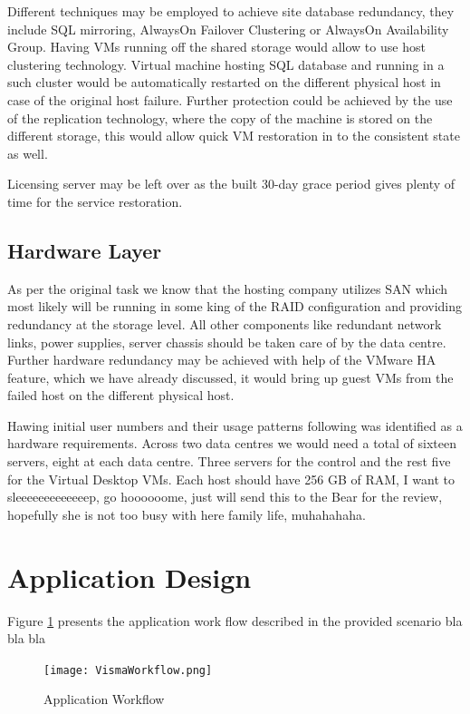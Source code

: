 \documentclass[a4paper]{article}
\begin{document}
	Different techniques may be employed to achieve site database redundancy, they include SQL mirroring, AlwaysOn Failover Clustering or AlwaysOn Availability Group. Having VMs running off the shared storage would allow to use host clustering technology. Virtual machine hosting SQL database and running in a such cluster would be automatically restarted on the different physical host in case of the original host failure. Further protection could be achieved by the use of the replication technology, where the copy of the machine is stored on the different storage, this would allow quick VM restoration in to the consistent state as well.
	
	Licensing server may be left over as the built 30-day grace period gives plenty of time for the service restoration.	
	\subsection{Hardware Layer}
	As per the original task we know that the hosting company utilizes SAN which most likely will be running in some king of the RAID configuration and providing redundancy at the storage level. All other components like redundant network links, power supplies, server chassis should be taken care of by the data centre. Further hardware redundancy may be achieved with help of the VMware HA feature, which we have already discussed, it would bring up guest VMs from the failed host on the different physical host.
	
	Hawing initial user numbers and their usage patterns following was identified as a hardware requirements. Across two data centres we would need a total of sixteen servers, eight at each data centre. Three servers for the control and the rest five for the Virtual Desktop VMs. Each host should have 256 GB of RAM, I want to sleeeeeeeeeeeeep, go hoooooome, just will send this to the Bear for the review, hopefully she is not too busy with here family life, muhahahaha.
	
	
	\section {Application Design}
	Figure \ref{fig:VismaWorkflow} presents the application work flow described in the provided scenario bla bla bla
	\begin{figure}
		\centering
		\texttt{[image: VismaWorkflow.png]}
		\caption{\label{fig:VismaWorkflow}Application Workflow}
	\end{figure}

\end{document}
